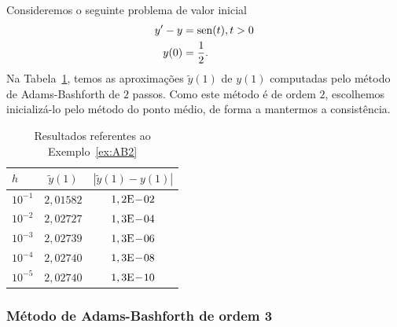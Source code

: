 \begin{ex}\label{ex:AB2}
  Consideremos o seguinte problema de valor inicial
  \begin{align}
    y' - y &= \operatorname{sen}(t), t>0\\
    y(0) &= \frac{1}{2}.
  \end{align}
  Na Tabela~\ref{tab:ex_AB2}, temos as aproximações $\tilde{y}(1)$ de $y(1)$ computadas pelo método de Adams-Bashforth de $2$ passos. Como este método é de ordem $2$, escolhemos inicializá-lo pelo método do ponto médio, de forma a mantermos a consistência.
 
  \begin{table}[h!]
    \centering
    \begin{tabular}{l|cc}
      $h$ & $\tilde{y}(1)$ & $|\tilde{y}(1)-y(1)|$\\\hline
      $10^{-1}$ & $2,01582$ & $1,2\mathrm{E}\!-\!02$ \\
      $10^{-2}$ & $2,02727$ & $1,3\mathrm{E}\!-\!04$ \\
      $10^{-3}$ & $2,02739$ & $1,3\mathrm{E}\!-\!06$ \\
      $10^{-4}$ & $2,02740$ & $1,3\mathrm{E}\!-\!08$ \\
      $10^{-5}$ & $2,02740$ & $1,3\mathrm{E}\!-\!10$ \\\hline
    \end{tabular}
    \caption{Resultados referentes ao Exemplo~\ref{ex:AB2}}
    \label{tab:ex_AB2}
  \end{table}






\end{ex}

\subsubsection{Método de Adams-Bashforth de ordem 3}

